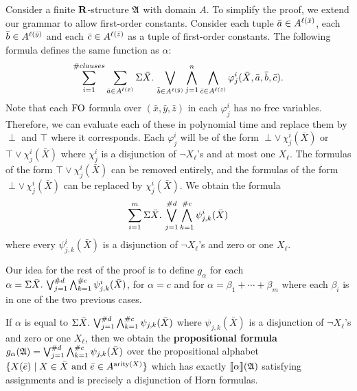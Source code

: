 Consider a finite $\mathbf{R}$-structure $\mathfrak{A}$ with domain $A$. To simplify the proof, we extend our grammar to allow first-order constants. Consider each tuple $\bar{a}\in A^{\ell(\bar{x})}$, each $\bar{b}\in A^{\ell(\bar{y})}$ and each $\bar{c}\in A^{\ell(\bar{z})}$ as a tuple of first-order constants. The following formula defines the same function as $\alpha$:
$$
\sum_{i = 1}^{\#clauses} \sum_{\bar{a}\in A^{\ell(\bar{x})}} \Sigma{\bar{X}}.\,\bigvee_{\bar{b}\in A^{\ell(\bar{y})}}\bigwedge_{j = 1}^{n}\bigwedge_{\bar{c}\in A^{\ell(\bar{z})}}\varphi^i_j(\bar{X},\bar{a},\bar{b},\bar{c}).
$$
Note that each ${\rm FO}$ formula over $(\bar{x},\bar{y},\bar{z})$ in each $\varphi^i_j$ has no free variables. Therefore, we can evaluate each of these in polynomial time and replace them by $\perp$ and $\top$ where it corresponds. Each $\varphi^i_j$ will be of the form $\perp \vee\, \chi^i_j(\bar{X})$ or $\top \vee \chi^i_j(\bar{X})$ where $\chi^i_j$ is a disjunction of $\neg X_{\ell}$'s and at most one $X_{\ell}$. The formulas of the form $\top \vee \chi^i_j(\bar{X})$ can be removed entirely, and the formulas of the form $\perp \vee\, \chi^i_j(\bar{X})$ can be replaced by $\chi^i_j(\bar{X})$. We obtain the formula
$$
\sum_{i = 1}^{m}\Sigma{\bar{X}}.\,\bigvee_{j = 1}^{\#d}\bigwedge_{k = 1}^{\#c}\psi^{i}_{j,k}(\bar{X})
$$
where every $\psi^{i}_{j,k}(\bar{X})$ is a disjunction of $\neg X_{\ell}$'s and zero or one $X_{\ell}$.

Our idea for the rest of the proof is to define $g_{\alpha}$ for each $\alpha = \Sigma{\bar{X}}.\,\bigvee_{j = 1}^{\#d}\bigwedge_{k = 1}^{\#c}\psi^{i}_{j,k}(\bar{X})$, for $\alpha = c$ and for $\alpha = \beta_1 + \cdots + \beta_m$ where each $\beta_i$ is in one of the two previous cases.

If $\alpha$ is equal to $\Sigma{\bar{X}}.\,\bigvee_{j = 1}^{\#d}\bigwedge_{k = 1}^{\#c}\psi_{j,k}(\bar{X})$ where $\psi_{j,k}(\bar{X})$ is a disjunction of $\neg X_{\ell}$'s and zero or one $X_{\ell}$, then we obtain the {\bf propositional formula} $g_{\alpha}(\mathfrak{A}) = \bigvee_{j = 1}^{\#d}\bigwedge_{k = 1}^{\#c}\psi_{j,k}(\bar{X})$ over the propositional alphabet $\{X(\bar{e}) \mid X \in \bar{X} \text{ and } \bar{e}\in A^{{\rm arity}(X)} \}$ which has exactly ${\llbracket{}{\alpha}\rrbracket}(\mathfrak{A})$ satisfying assignments and is precisely a disjunction of Horn formulas.

